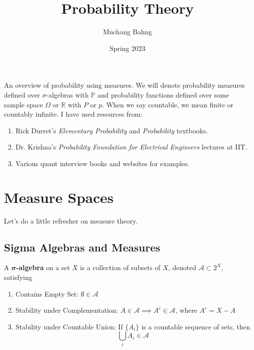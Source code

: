 \documentclass{article}
\begin{document}
\title{Probability Theory}
\author{Muchang Bahng}
\date{Spring 2023}

\maketitle
\tableofcontents
\pagebreak

  An overview of probability using measures. We will denote probability measures defined over $\sigma$-algebras with $\mathbb{P}$ and probability functions defined over some sample space $\Omega$ or $\mathbb{R}$ with $P$ or $p$. When we say countable, we mean finite or countably infinite. I have used resources from: 
  \begin{enumerate}
    \item Rick Durret's \textit{Elementary Probability} and \textit{Probability} textbooks. 
    \item Dr. Krishna's \textit{Probability Foundation for Electrical Engineers} lectures at IIT. 
    \item Various quant interview books and websites for examples. 
  \end{enumerate}

\section{Measure Spaces}

  Let's do a little refresher on measure theory. 

  \subsection{Sigma Algebras and Measures}

    \begin{definition}
      A $\boldsymbol{\sigma}$\textbf{-algebra} on a set $X$ is a collection of subsets of $X$, denoted $\mathcal{A} \subset 2^X$, satisfying
      \begin{enumerate}
        \item Contains Empty Set: $\emptyset \in \mathcal{A}$ 
        \item Stability under Complementation: $A \in \mathcal{A} \implies A^c \in \mathcal{A}$, where $A^c = X - A$ 
        \item Stability under Countable Union: If $\{A_i\}$ is a countable sequence of sets, then 
        \begin{equation}
          \bigcup_i A_i \in \mathcal{A}
        \end{equation}
      \end{enumerate}
    \end{definition}
\end{document}
